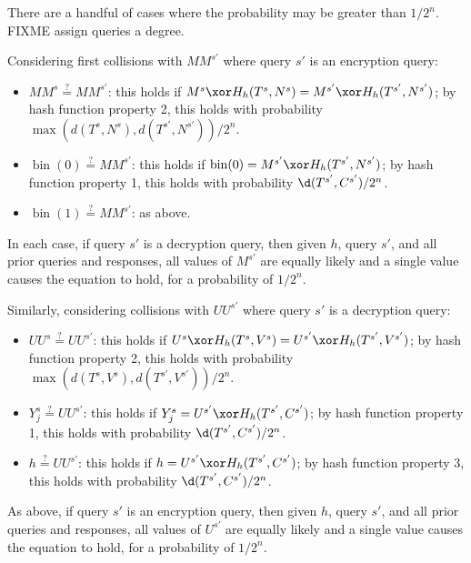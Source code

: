 \documentclass[letterpaper,11pt]{article}
\newcommand*{\MM}{\mathit{MM}}
\newcommand*{\qeq}{\stackrel{\text{?}}{=}}
\newcommand*{\UU}{\mathit{UU}}
\DeclareMathOperator{\fromint}{bin}
\begin{document}
There are a handful of cases where the probability may
be greater than \(1/2^n\). FIXME assign queries
a degree.

Considering first collisions with \(\MM^{s'}\) where
query \(s'\) is an encryption query:

\begin{itemize}
    \item \(\MM^s \qeq \MM^{s'}\):
    this holds if \(M^s \xor H_h(T^s, N^s) = M^{s'} \xor H_h(T^{s'}, N^{s'})\);
    by hash function property 2, this holds with probability
    \(\max(d(T^s, N^s), d(T^{s'}, N^{s'}))/2^n\).
    \item \(\fromint(0) \qeq \MM^{s'}\):
    this holds if \(\fromint(0) = M^{s'} \xor H_h(T^{s'}, N^{s'})\);
    by hash function property 1, this holds with probability
    \(\d(T^{s'}, C^{s'})/2^n\).
    \item \(\fromint(1) \qeq \MM^{s'}\): as above.
\end{itemize}

In each case, if query \(s'\) is a decryption query,
then given \(h\), query \(s'\), and all prior
queries and responses, all values of \(M^{s'}\)
are equally likely and a single value causes
the equation to hold, for a probability of
\(1/2^n\).

Similarly, considering collisions with \(\UU^{s'}\) where
query \(s'\) is a decryption query:

\begin{itemize}
    \item \(\UU^s \qeq \UU^{s'}\): 
    this holds if \(U^s \xor H_h(T^s, V^s) = U^{s'} \xor H_h(T^{s'}, V^{s'})\);
    by hash function property 2, this holds with probability
    \(\max(d(T^s, V^s), d(T^{s'}, V^{s'}))/2^n\).
    \item \(Y_j^s \qeq \UU^{s'}\):
    this holds if \(Y_j^s = U^{s'} \xor H_h(T^{s'}, C^{s'})\);
    by hash function property 1, this holds with probability
    \(\d(T^{s'}, C^{s'})/2^n\).
    \item \(h \qeq \UU^{s'}\):
    this holds if \(h = U^{s'} \xor H_h(T^{s'}, C^{s'})\);
    by hash function property 3, this holds with probability
    \(\d(T^{s'}, C^{s'})/2^n\).
\end{itemize}

As above, if query \(s'\) is an encryption query,
then given \(h\), query \(s'\), and all prior
queries and responses, all values of \(U^{s'}\)
are equally likely and a single value causes
the equation to hold, for a probability of
\(1/2^n\).
\end{document}
